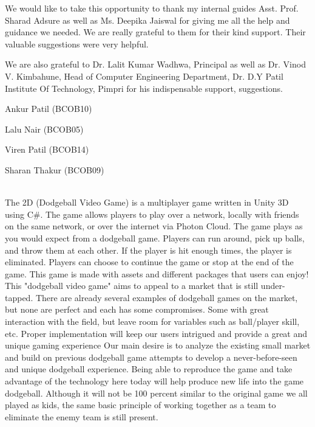 \documentclass[12pt]{report}
\begin{document}
We would like to take this opportunity to thank my internal guides Asst. Prof. Sharad Adsure as well as Ms. Deepika Jaiswal for giving me all the help and guidance we needed. We are really grateful to them for their kind support. Their valuable suggestions were very helpful. 


We are also grateful to Dr. Lalit Kumar Wadhwa, Principal as well as Dr. Vinod V. Kimbahune, Head of Computer Engineering Department, Dr. D.Y Patil Institute Of Technology, Pimpri for his indispensable support, suggestions.


\begin{flushright}

\normalsize  {Ankur Patil (BCOB10)}

\normalsize  {Lalu Nair (BCOB05)}

\normalsize  {Viren Patil (BCOB14)}

\normalsize  {Sharan Thakur (BCOB09)}
\end{flushright}
\clearpage
 
\vspace{4 cm}
\\
\vspace{1 cm}
\justifying
\setlength{\parindent}{4em}
\setlength{\parskip}{1em}
\renewcommand{\baselinestretch}{1.5}
\normalsize
The 2D (Dodgeball Video Game) is a multiplayer game written in Unity 3D using C\#. The game allows players to play over a network, locally with friends on the same network, or over the internet via Photon Cloud. The game plays as you would expect from a dodgeball game. Players can run around, pick up balls, and throw them at each other. If the player is hit enough times, the player is eliminated. Players can choose to continue the game or stop at the end of the game. This game is made with assets and different packages that users can enjoy! This "dodgeball video game" aims to appeal to a market that is still under-tapped. There are already several examples of dodgeball games on the market, but none are perfect and each has some compromises. Some with great interaction with the field, but leave room for variables such as ball/player skill, etc. Proper implementation will keep our users intrigued  and provide a great and unique gaming experience Our main desire is to analyze the existing small market and build on previous dodgeball game attempts to develop a never-before-seen and unique dodgeball experience. Being able to reproduce the game and take advantage of the technology here today will help produce new life into the game dodgeball. Although it will not be 100 percent similar to the original game we all played as kids, the same basic principle of working together as a team to eliminate the enemy team is still present.
\end{document}
